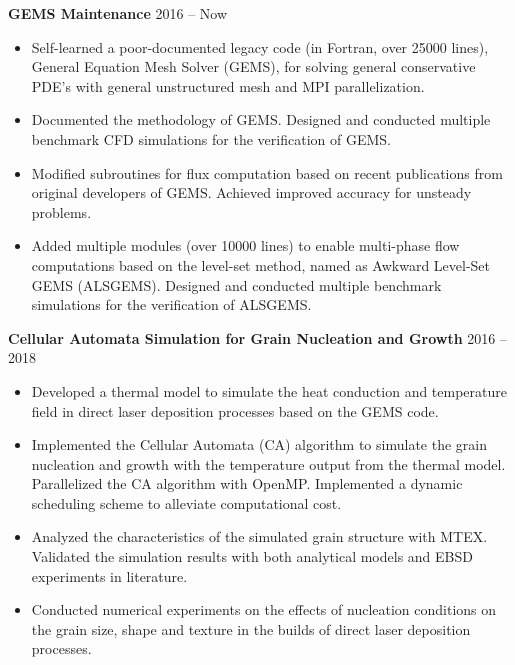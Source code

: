 \documentclass[12pt, letterpaper]{article}
\begin{document}
\vspace{3pt}

\textbf{GEMS Maintenance} \hfill 2016 -- Now
\begin{itemize}[leftmargin=*, labelsep=5mm]
   \item Self-learned a poor-documented legacy code (in Fortran, over 25000 lines), General Equation
      Mesh Solver (GEMS), for solving general conservative PDE's with general unstructured mesh and
      MPI parallelization.
   \item Documented the methodology of GEMS. Designed and conducted multiple benchmark CFD
      simulations for the verification of GEMS.
   \item Modified subroutines for flux computation based on recent publications from
      original developers of GEMS. Achieved improved accuracy for unsteady problems.
   \item Added multiple modules (over 10000 lines) to enable multi-phase flow computations based on
      the level-set method, named as Awkward Level-Set GEMS (ALSGEMS). Designed and conducted
      multiple benchmark simulations for the verification of ALSGEMS. 
\end{itemize}

\vspace{3pt}

\textbf{Cellular Automata Simulation for Grain Nucleation and Growth} \hfill 2016 -- 2018
\begin{itemize}[leftmargin=*, labelsep=5mm]
   \item Developed a thermal model to simulate the heat conduction and temperature field in direct
      laser deposition processes based on the GEMS code.
   \item Implemented the Cellular Automata (CA) algorithm to simulate the grain nucleation and
      growth with the temperature output from the thermal model. Parallelized the CA algorithm with
      OpenMP. Implemented a dynamic scheduling scheme to alleviate computational cost.
   \item Analyzed the characteristics of the simulated grain structure with MTEX. Validated the
      simulation results with both analytical models and EBSD experiments in literature.
   \item Conducted numerical experiments on the effects of nucleation conditions on the grain size,
      shape and texture in the builds of direct laser deposition processes.
\end{itemize}
\end{document}
